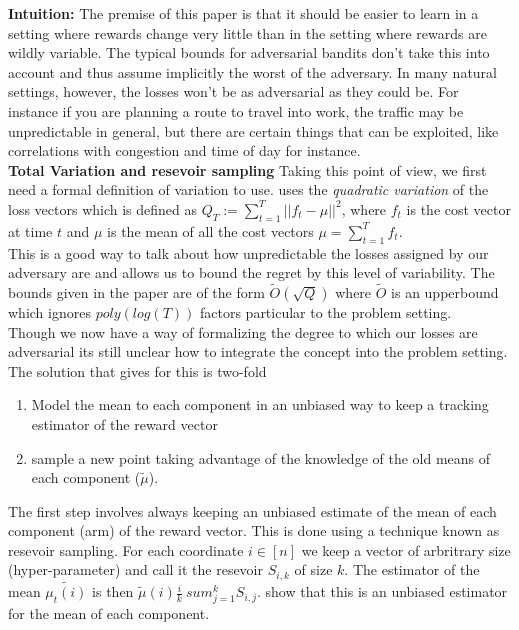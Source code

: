 \textbf{Intuition:}
The premise of this paper is that it should be easier to learn in a setting where
rewards change very little than in the setting where rewards are wildly variable. 
The typical bounds for adversarial bandits don't take this into account and thus assume implicitly the 
worst of the adversary. In many natural settings, however, the losses won't be as adversarial as they could be. For
instance if you are planning a route to travel into work, the traffic may be unpredictable in general, but there 
are certain things that can be exploited, like correlations with congestion and time of day for instance.\\

\textbf{Total Variation and resevoir sampling}
Taking this point of view, we first need a formal definition of variation to use.  \citep{hazan} uses the
\textit{quadratic variation} of the loss vectors which is defined as $Q_T := \sum_{t=1}^T || f_t - \mu ||^2$,
where $f_t$ is the cost vector at time $t$ and $\mu$ is the mean of all the cost vectors
$\mu = \sum_{t=1}^T f_t$. \\

This is a good  way to talk about how unpredictable the losses assigned by our adversary are and allows us to bound the
regret by this level of variability. The bounds given in the paper are of the form
$\tilde{O}(\sqrt{Q})$ where $\tilde{O}$ is an upperbound which ignores $poly(log(T))$ factors
particular to the problem setting. \\

Though we now have a way of formalizing the degree to which our losses are adversarial its still unclear
how to integrate the concept into the problem setting. The solution that \citep{hazan} gives for this is two-fold

\begin{enumerate}
\item
  Model the mean to each component in an unbiased way to keep a tracking estimator of the reward vector 
\item
  sample a new point taking advantage of the knowledge of the old means of each component ($\tilde{\mu}$).
\end{enumerate}

The first step involves always keeping an unbiased estimate of the mean of each component (arm) of 
the reward vector. This is done using a technique known as resevoir sampling.
For each coordinate $i\in[n]$ we keep a vector of arbritrary size (hyper-parameter) and call it the resevoir $S_{i, k}$ of size $k$.
The estimator of the mean $\tilde{\mu_t(i)}$ is then  $\tilde{\mu}(i) \frac{i}{k} \ sum_{j=1}^kS_{i, j}$. 
\citep{hazan} show that this is an unbiased estimator for the mean of each component.\\


